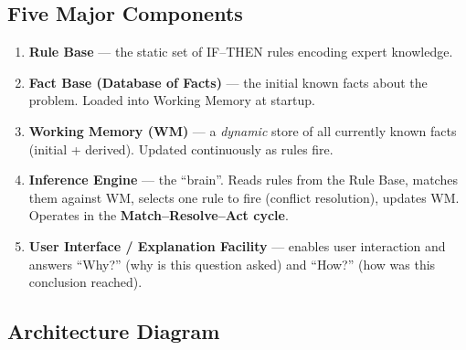 \documentclass[12pt,a4paper]{article}
\begin{document}
\subsection{Five Major Components}

\begin{enumerate}[itemsep=5pt]
  \item \textbf{Rule Base} --- the static set of IF--THEN rules encoding expert knowledge.
  \item \textbf{Fact Base (Database of Facts)} --- the initial known facts about the problem.
        Loaded into Working Memory at startup.
  \item \textbf{Working Memory (WM)} --- a \emph{dynamic} store of all currently known facts
        (initial + derived). Updated continuously as rules fire.
  \item \textbf{Inference Engine} --- the ``brain''. Reads rules from the Rule Base, matches them
        against WM, selects one rule to fire (conflict resolution), updates WM.
        Operates in the \textbf{Match--Resolve--Act cycle}.
  \item \textbf{User Interface / Explanation Facility} --- enables user interaction and answers
        ``Why?'' (why is this question asked) and ``How?'' (how was this conclusion reached).
\end{enumerate}

\subsection{Architecture Diagram}
\end{document}
